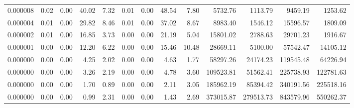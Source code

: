 \begin{tabular}{lrrrrrrrrrrrr}
0.000008 & 0.02 & 0.00 & 40.02 & 7.32 & 0.01 & 0.00 & 48.54 & 7.80 & 5732.76 & 1113.79 & 9459.19 & 1253.62 \\
0.000004 & 0.01 & 0.00 & 29.82 & 8.46 & 0.01 & 0.00 & 37.02 & 8.67 & 8983.40 & 1546.12 & 15596.57 & 1809.09 \\
0.000002 & 0.01 & 0.00 & 16.85 & 3.73 & 0.00 & 0.00 & 21.19 & 5.04 & 15801.02 & 2788.63 & 29701.23 & 1916.67 \\
0.000001 & 0.00 & 0.00 & 12.20 & 6.22 & 0.00 & 0.00 & 15.46 & 10.48 & 28669.11 & 5100.00 & 57542.47 & 14105.12 \\
0.000000 & 0.00 & 0.00 & 4.25 & 2.02 & 0.00 & 0.00 & 4.63 & 1.77 & 58297.26 & 24174.23 & 119545.48 & 64226.94 \\
0.000000 & 0.00 & 0.00 & 3.26 & 2.19 & 0.00 & 0.00 & 4.78 & 3.60 & 109523.81 & 51562.41 & 225738.93 & 122781.63 \\
0.000000 & 0.00 & 0.00 & 1.70 & 0.89 & 0.00 & 0.00 & 2.11 & 3.05 & 185962.19 & 85394.42 & 340191.56 & 225518.16 \\
0.000000 & 0.00 & 0.00 & 0.99 & 2.31 & 0.00 & 0.00 & 1.43 & 2.69 & 373015.87 & 279513.73 & 843579.96 & 550262.37 \\
\bottomrule
\end{tabular}
